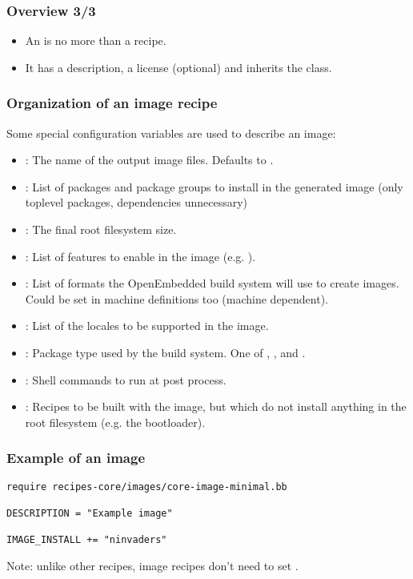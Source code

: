 \begin{frame}
  \frametitle{Overview 3/3}
  \begin{itemize}
    \item An  is no more than a recipe.
    \item It has a description, a license (optional) and inherits the
       class.
  \end{itemize}
\end{frame}

\begin{frame}
  \frametitle{Organization of an image recipe}
  Some special configuration variables are used to describe an image:
      \begin{itemize}
        \item {}: The name of the output image files.
          Defaults to .
        \item {}: List of packages and package groups to
          install in the generated image (only toplevel packages, dependencies unnecessary)
        \item {}: The final root filesystem size.
        \item {}: List of features to enable in the
          image (e.g. ).
        \item {}: List of formats the OpenEmbedded build
          system will use to create images. Could be set in machine
          definitions too (machine dependent).
        \item {}: List of the locales to be supported in
          the image.
        \item {}: Package type used by the build system.
          One of , ,  and .
        \item {}: Shell commands to run at
          post process.
        \item {}: Recipes to be built with the image, but
          which do not install anything in the root filesystem
          (e.g. the bootloader).
      \end{itemize}
\end{frame}

\begin{frame}[fragile]
  \frametitle{Example of an image}
  \begin{block}{}
    \begin{verbatim}
require recipes-core/images/core-image-minimal.bb

DESCRIPTION = "Example image"

IMAGE_INSTALL += "ninvaders"
    \end{verbatim}
  \end{block}
  Note: unlike other recipes, image recipes don't need to set
  .
\end{frame}

